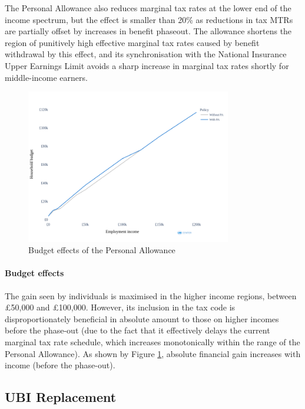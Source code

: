 \documentclass{article}
\begin{document}
    The Personal Allowance also reduces marginal tax rates at the lower end of the income spectrum, but the effect is smaller than 20\% as reductions in tax MTRs are partially offset by increases in benefit phaseout. The allowance shortens the region of punitively high effective marginal tax rates caused by benefit withdrawal by this effect, and its synchronisation with the National Insurance Upper Earnings Limit avoids a sharp increase in marginal tax rates shortly for middle-income earners.

    \begin{figure}
        \centering
        \includegraphics[width=0.8\textwidth]{images/fig_3.png}
        \caption{Budget effects of the Personal Allowance}
        \label{fig:PA_budget_effects}
    \end{figure}

    \paragraph{Budget effects} The gain seen by individuals is maximised in the higher income regions, between £50,000 and £100,000. However, its inclusion in the tax code is disproportionately beneficial in absolute amount to those on higher incomes before the phase-out (due to the fact that it effectively delays the current marginal tax rate schedule, which increases monotonically within the range of the Personal Allowance). As shown by Figure \ref{fig:PA_budget_effects}, absolute financial gain increases with income (before the phase-out).

    \subsection{UBI Replacement}
\end{document}
